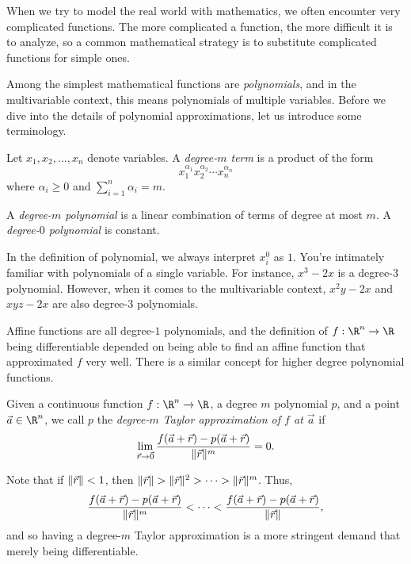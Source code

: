 When we try to model the real world with mathematics, we often
encounter very complicated functions.  The more complicated
a function, the more difficult it is to analyze, so a common mathematical
strategy is to substitute complicated functions for simple ones.

Among the simplest mathematical functions are \emph{polynomials}, and in the
multivariable context, this means polynomials of multiple variables.
Before we dive into the details of polynomial approximations, let us
introduce some terminology.

\begin{definition}[Polynomial]
	Let $x_1,x_2,\ldots,x_n$ denote variables.  A \emph{degree-$m$ term}
	is a product of the form
	\[
		x_1^{\alpha_1}x_2^{\alpha_2}\cdots x_n^{\alpha_n}
	\]
	where $\alpha_i\geq 0$ and $\sum_{i=1}^n \alpha_i = m$.

	A \emph{degree-$m$ polynomial} is a linear combination
	of terms of degree at most $m$.  A \emph{degree-$0$ polynomial} is constant.
\end{definition}

In the definition of polynomial, we always interpret $x_i^{0}$ as $1$.  You're intimately
familiar with polynomials of a single variable.  For instance, $x^3-2x$ is a degree-$3$ 
polynomial.  However, when it comes to the multivariable context, $x^2y-2x$ and $xyz-2x$ are
also degree-$3$ polynomials.

Affine functions are all degree-$1$ polynomials, and the definition of 
$f:\R^n\to\R$ being differentiable
depended on being able to find an affine function that approximated $f$ very well.
There is a similar concept for higher degree polynomial functions.

\begin{definition}
	Given a continuous
	function $f:\R^n\to\R$, a degree $m$ polynomial $p$, and a point 
	$\vec a\in\R^n$, we
	call $p$ the \emph{degree-$m$ Taylor approximation of $f$ at $\vec a$} if
	\[
		\lim_{\vec r\to \vec 0} \frac{f(\vec a+\vec r)-p(\vec a+\vec r)}{\lVert\vec r\rVert^m}=0.
	\]
\end{definition}

Note that if $\lVert\vec r\rVert<1$, then $\lVert\vec r\rVert > \lVert\vec r\rVert^2> \cdots >\lVert\vec r\rVert^m$.
Thus, 
\[
	\frac{f(\vec a+\vec r)-p(\vec a+\vec r)}{\lVert\vec r\rVert^m}<\cdots<
\frac{f(\vec a+\vec r)-p(\vec a+\vec r)}{\lVert\vec r\rVert},
\]
and so having a degree-$m$ Taylor approximation is a more stringent demand that merely being
differentiable.

